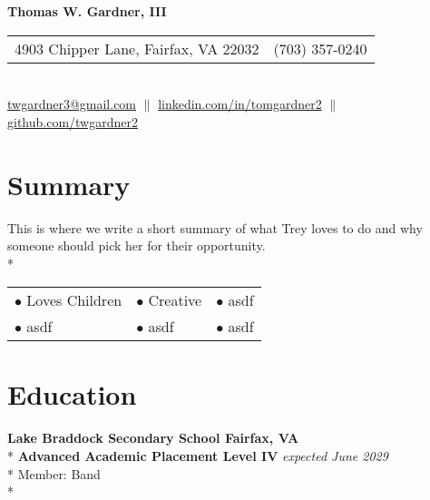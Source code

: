 \documentclass{article}
\begin{document}
\begin{center} 
\textbf{\LARGE Thomas W. Gardner, III} \\
\begin{tabular}{@{} l l}
	4903 Chipper Lane, Fairfax, VA 22032 	& (703) 357-0240 \\
\end{tabular} \\
\href{mailto:twgardner3@gmail.com}{twgardner3@gmail.com} $\parallel$ \href{https://www.linkedin.com/in/tomgardner2}{linkedin.com/in/tomgardner2} $\parallel$ \href{https://www.github.com/twgardner2}{github.com/twgardner2} \\
\end{center}
\section{Summary}
This is where we write a short summary of what Trey loves to do and why someone should pick her for their opportunity. \\*
\begin{minipage}{\textwidth}

\vspace{0.25cm}
\centering
\begin{tabular}{@{}p{5cm} p{5cm} p{5cm}}
	$\bullet$ Loves Children	& $\bullet$ Creative	& $\bullet$ asdf \\*
	$\bullet$ asdf 		& $\bullet$ asdf & $\bullet$ asdf \\*
\end{tabular}
\end{minipage}

\section{Education} 

\noindent \textbf{Lake Braddock Secondary School \hfill Fairfax, VA} \\*
\textbf{Advanced Academic Placement Level IV} \hfill \textit{expected June 2029} \\*
\textendash Member: Band \\*
\end{document}
